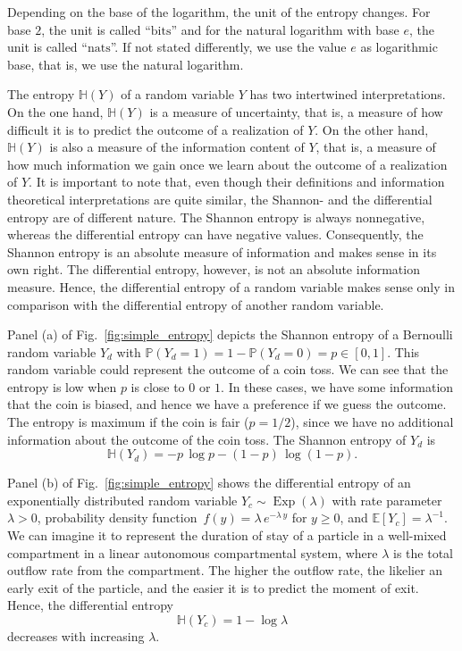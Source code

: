\documentclass[smallextended]{svjour3}
\renewcommand{\P}{\mathbb{P}}
\newcommand{\E}{\mathbb{E}}
\renewcommand{\H}{\mathbb{H}}
\newcommand{\Exp}{\operatorname{Exp}}
\newcommand{\bits}{\mathrm{bits}}
\newcommand{\nats}{\mathrm{nats}}
\newcommand{\ie}{that is}
\newcommand{\pdf}{probability density function}
\renewcommand{\emph}[1]{``#1''}
\begin{document}
\begin{myremark}
	Depending on the base of the logarithm, the unit of the entropy changes.
	For base $2$, the unit is called \emph{$\bits$} and for the natural logarithm with base $e$, the unit is called \emph{$\nats$}.
	If not stated differently, we use the value $e$ as logarithmic base, \ie, we use the natural logarithm.
\end{myremark}

The entropy $\H(Y)$ of a random variable $Y$ has two intertwined interpretations.
On the one hand, $\H(Y)$ is a measure of uncertainty, \ie, a measure of how difficult it is to predict the outcome of a realization of $Y$.
On the other hand, $\H(Y)$ is also a measure of the information content of $Y$, \ie, a measure of how much information we gain once we learn about the outcome of a realization of $Y$.
It is important to note that, even though their definitions and information theoretical interpretations are quite similar, the Shannon- and the differential entropy are of different nature.
The Shannon entropy is always nonnegative, whereas the differential entropy can have negative values.
Consequently, the Shannon entropy is an absolute measure of information and makes sense in its own right.
The differential entropy, however, is not an absolute information measure.
Hence, the differential entropy of a random variable makes sense only in comparison with the differential entropy of another random variable.

Panel (a) of Fig.~\ref{fig:simple_entropy} depicts the Shannon entropy of a Bernoulli random variable $Y_d$ with $\P(Y_d=1)=1-\P(Y_d=0)=p\in[0,1]$.
This random variable could represent the outcome of a coin toss.
We can see that the entropy is low when $p$ is close to $0$ or $1$.
In these cases, we have some information that the coin is biased, and hence we have a preference if we guess the outcome.
The entropy is maximum if the coin is fair ($p=1/2$), since we have no additional information about the outcome of the coin toss.
The Shannon entropy of $Y_d$ is
\begin{equation}
	\H(Y_d) = -p\,\log p - (1-p)\,\log(1-p).
\end{equation}

Panel (b) of Fig.~\ref{fig:simple_entropy} shows the differential entropy of an exponentially distributed random variable $Y_c\sim\Exp(\lambda)$ with rate parameter $\lambda>0$, \pdf\ $f(y) = \lambda\,e^{-\lambda\,y}$ for $y\geq0$, and $\E\left[Y_c\right]=\lambda^{-1}$.
We can imagine it to represent the duration of stay of a particle in a well-mixed compartment in a linear autonomous compartmental system, where $\lambda$ is the total outflow rate from the compartment.
The higher the outflow rate, the likelier an early exit of the particle, and the easier it is to predict the moment of exit.
Hence, the differential entropy
\begin{equation}
	\H(Y_c) = 1-\log\lambda
\end{equation}
decreases with increasing $\lambda$.
\end{document}
